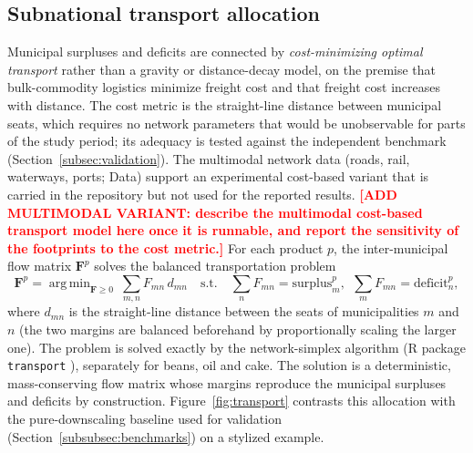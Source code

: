 \documentclass[pdflatex,sn-nature]{sn-jnl}%
\DeclareMathOperator*{\argmin}{arg\,min}
\begin{document}
\subsection{Subnational transport allocation}\label{subsec:transport}
Municipal surpluses and deficits are connected by \emph{cost-minimizing
optimal transport} rather than a gravity or distance-decay model, on the
premise that bulk-commodity logistics minimize freight cost and that freight
cost increases with distance. The cost metric is the straight-line distance
between municipal seats, which requires no network parameters that would be
unobservable for parts of the study period; its adequacy is tested against
the independent benchmark
(Section~\ref{subsec:validation}). The multimodal network data (roads, rail,
waterways, ports; Data) support an experimental cost-based variant that is
carried in the repository but not used for the reported results.
\textcolor{red}{\textbf{[ADD MULTIMODAL VARIANT: describe the multimodal
cost-based transport model here once it is runnable, and report the
sensitivity of the footprints to the cost metric.]}} For each
product $p$, the inter-municipal flow matrix $\mathbf{F}^p$ solves the
balanced transportation problem
\begin{equation}\label{eq:ot}
  \mathbf{F}^{p}=\argmin_{\mathbf{F}\ge0}\ \sum_{m,n}F_{mn}\,d_{mn}
  \quad\text{s.t.}\quad
  \sum_{n}F_{mn}=\text{surplus}^p_m,\ \
  \sum_{m}F_{mn}=\text{deficit}^p_n,
\end{equation}
where $d_{mn}$ is the straight-line distance between the seats of
municipalities $m$ and $n$ (the two margins are balanced beforehand by
proportionally scaling the larger one). The problem is solved exactly by the
network-simplex algorithm (R package \texttt{transport}
\cite{schuhmacher2023transport}), separately for beans, oil and cake. The
solution is a deterministic, mass-conserving flow matrix whose margins
reproduce the municipal surpluses and deficits by construction.
Figure~\ref{fig:transport} contrasts this allocation with the
pure-downscaling baseline used for validation
(Section~\ref{subsubsec:benchmarks}) on a stylized example.
\end{document}
